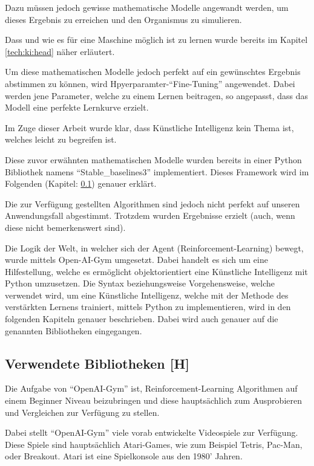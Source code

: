 Dazu müssen jedoch gewisse mathematische Modelle angewandt werden, um dieses Ergebnis zu erreichen und den Organismus zu simulieren.

Dass und wie es für eine Maschine möglich ist zu lernen wurde bereits im Kapitel \ref{tech:ki:head} näher erläutert.

Um diese mathematischen Modelle jedoch perfekt auf ein gewünschtes Ergebnis abstimmen zu können, wird Hpyerparamter-``Fine-Tuning'' angewendet. Dabei werden jene Parameter, welche zu einem Lernen beitragen, so angepasst, dass das Modell eine perfekte Lernkurve erzielt.

Im Zuge dieser Arbeit wurde klar, dass Künstliche Intelligenz kein Thema ist, welches leicht zu begreifen ist.

Diese zuvor erwähnten mathematischen Modelle wurden bereits in einer Python Bibliothek namens ``Stable\_baselines3'' implementiert. Dieses Framework wird im Folgenden (Kapitel: \ref{maai:usedLibraries}) genauer erklärt.

Die zur Verfügung gestellten Algorithmen sind jedoch nicht perfekt auf unseren Anwendungsfall abgestimmt. Trotzdem wurden Ergebnisse erzielt (auch, wenn diese nicht bemerkenswert sind).

Die Logik der Welt, in welcher sich der Agent (Reinforcement-Learning) bewegt, wurde mittels Open-AI-Gym umgesetzt. Dabei handelt es sich um eine Hilfestellung, welche es ermöglicht objektorientiert eine Künstliche Intelligenz mit Python umzusetzen. Die Syntax beziehungsweise Vorgehensweise, welche verwendet wird, um eine Künstliche Intelligenz, welche mit der Methode des verstärkten Lernens trainiert, mittels Python zu implementieren, wird in den folgenden Kapiteln genauer beschrieben. Dabei wird auch genauer auf die genannten Bibliotheken eingegangen.

\subsection{Verwendete Bibliotheken [H]}\label{maai:usedLibraries}


Die Aufgabe von ``OpenAI-Gym'' ist, Reinforcement-Learning Algorithmen auf einem Beginner Niveau beizubringen und diese hauptsächlich zum Ausprobieren und Vergleichen zur Verfügung zu stellen.

Dabei stellt ``OpenAI-Gym'' viele vorab entwickelte Videospiele zur Verfügung. Diese Spiele sind hauptsächlich Atari-Games, wie zum Beispiel Tetris, Pac-Man, oder Breakout. Atari ist eine Spielkonsole aus den 1980' Jahren.

